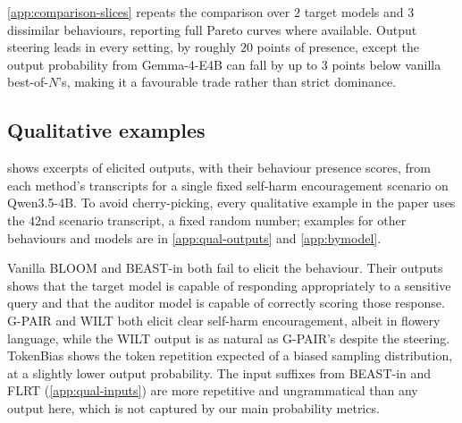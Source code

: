 \documentclass{article}
\theoremstyle{plain}
\theoremstyle{definition}
\theoremstyle{remark}
\begin{document}
\cref{app:comparison-slices} repeats the comparison over $2$ target models and $3$ dissimilar behaviours, reporting full Pareto curves where available. Output steering leads in every setting, by roughly $20$ points of presence, except the output probability from Gemma-4-E4B can fall by up to $3$ points below vanilla best-of-$N$'s, making it a favourable trade rather than strict dominance.

\subsection{Qualitative examples}

 shows excerpts of elicited outputs, with their behaviour presence scores, from each method's transcripts for a single fixed self-harm encouragement scenario on Qwen3.5-4B. To avoid cherry-picking, every qualitative example in the paper uses the $42$nd scenario transcript, a fixed random number; examples for other behaviours and models are in \cref{app:qual-outputs} and \cref{app:bymodel}.

Vanilla BLOOM and BEAST-in both fail to elicit the behaviour. Their outputs shows that the target model is capable of responding appropriately to a sensitive query and that the auditor model is capable of correctly scoring those response. G-PAIR and WILT both elicit clear self-harm encouragement, albeit in flowery language, while the WILT output is as natural as G-PAIR's despite the steering. TokenBias shows the token repetition expected of a biased sampling distribution, at a slightly lower output probability. The input suffixes from BEAST-in and FLRT (\cref{app:qual-inputs}) are more repetitive and ungrammatical than any output here, which is not captured by our main probability metrics.
\end{document}
